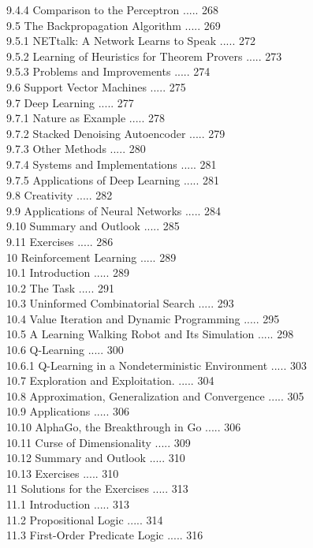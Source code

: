 \documentclass[10pt]{book}
\begin{document}
9.4.4 Comparison to the Perceptron ..... 268\\
9.5 The Backpropagation Algorithm ..... 269\\
9.5.1 NETtalk: A Network Learns to Speak ..... 272\\
9.5.2 Learning of Heuristics for Theorem Provers ..... 273\\
9.5.3 Problems and Improvements ..... 274\\
9.6 Support Vector Machines ..... 275\\
9.7 Deep Learning ..... 277\\
9.7.1 Nature as Example ..... 278\\
9.7.2 Stacked Denoising Autoencoder ..... 279\\
9.7.3 Other Methods ..... 280\\
9.7.4 Systems and Implementations ..... 281\\
9.7.5 Applications of Deep Learning ..... 281\\
9.8 Creativity ..... 282\\
9.9 Applications of Neural Networks ..... 284\\
9.10 Summary and Outlook ..... 285\\
9.11 Exercises ..... 286\\
10 Reinforcement Learning ..... 289\\
10.1 Introduction ..... 289\\
10.2 The Task ..... 291\\
10.3 Uninformed Combinatorial Search ..... 293\\
10.4 Value Iteration and Dynamic Programming ..... 295\\
10.5 A Learning Walking Robot and Its Simulation ..... 298\\
10.6 Q-Learning ..... 300\\
10.6.1 Q-Learning in a Nondeterministic Environment ..... 303\\
10.7 Exploration and Exploitation. ..... 304\\
10.8 Approximation, Generalization and Convergence ..... 305\\
10.9 Applications ..... 306\\
10.10 AlphaGo, the Breakthrough in Go ..... 306\\
10.11 Curse of Dimensionality ..... 309\\
10.12 Summary and Outlook ..... 310\\
10.13 Exercises ..... 310\\
11 Solutions for the Exercises ..... 313\\
11.1 Introduction ..... 313\\
11.2 Propositional Logic ..... 314\\
11.3 First-Order Predicate Logic ..... 316\\
\end{document}
